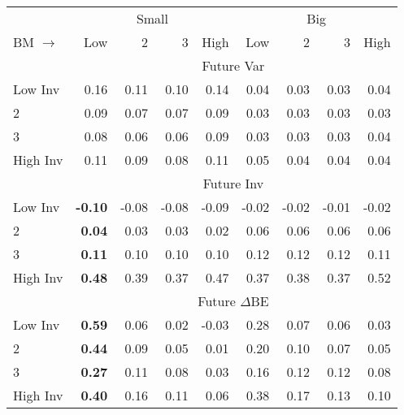 
\begin{tabular}{lrrrrrrrr}
  \toprule
     & \multicolumn{4}{c}{Small} & \multicolumn{4}{c}{Big}  \\
     \cmidrule(r){2-5} \cmidrule(r){6-9}
    BM $\rightarrow$ & Low & 2 & 3 & High & Low & 2 & 3 & High  \\ 
  \midrule
  
  
    
  
    & \multicolumn{8}{c}{Future Var}  \\
     \cmidrule(r){2-5} \cmidrule(r){6-9}
    Low Inv  & 0.16  & 0.11  & 0.10  & 0.14  & 0.04  & 0.03  & 0.03  & 0.04   \\
    2  & 0.09  & 0.07  & 0.07  & 0.09  & 0.03  & 0.03  & 0.03  & 0.03   \\
    3  & 0.08  & 0.06  & 0.06  & 0.09  & 0.03  & 0.03  & 0.03  & 0.04   \\
    High Inv  & 0.11  & 0.09  & 0.08  & 0.11  & 0.05  & 0.04  & 0.04  & 0.04   \\
    
  
    & \multicolumn{8}{c}{Future Inv}  \\
     \cmidrule(r){2-5} \cmidrule(r){6-9}
    Low Inv  & \textbf{-0.10}  & -0.08  & -0.08  & -0.09  & -0.02  & -0.02  & -0.01  & -0.02   \\
    2  & \textbf{0.04}  & 0.03  & 0.03  & 0.02  & 0.06  & 0.06  & 0.06  & 0.06   \\
    3  & \textbf{0.11}  & 0.10  & 0.10  & 0.10  & 0.12  & 0.12  & 0.12  & 0.11   \\
    High Inv  & \textbf{0.48}  & 0.39  & 0.37  & 0.47  & 0.37  & 0.38  & 0.37  & 0.52   \\
    
  
    & \multicolumn{8}{c}{Future $\Delta\text{BE}$}  \\
     \cmidrule(r){2-5} \cmidrule(r){6-9}
    Low Inv  & \textbf{0.59}  & 0.06  & 0.02  & -0.03  & 0.28  & 0.07  & 0.06  & 0.03   \\
    2  & \textbf{0.44}  & 0.09  & 0.05  & 0.01  & 0.20  & 0.10  & 0.07  & 0.05   \\
    3  & \textbf{0.27}  & 0.11  & 0.08  & 0.03  & 0.16  & 0.12  & 0.12  & 0.08   \\
    High Inv  & \textbf{0.40}  & 0.16  & 0.11  & 0.06  & 0.38  & 0.17  & 0.13  & 0.10   \\
    
  
  \bottomrule
\end{tabular}
